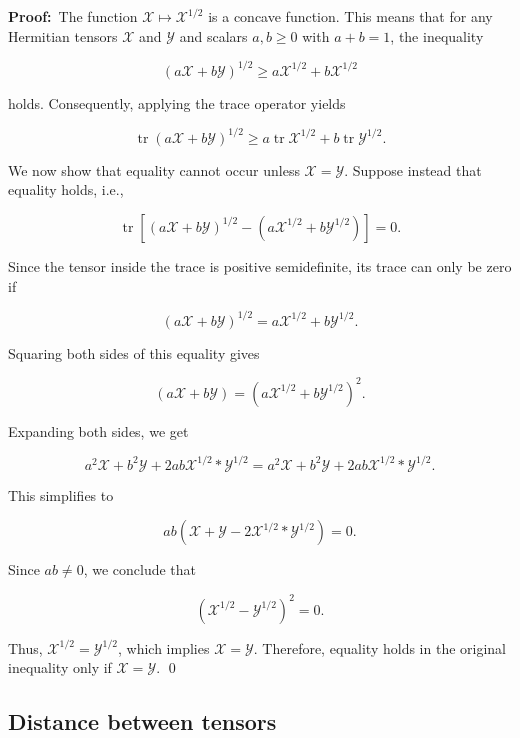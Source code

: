 \documentclass[oupthm]{CUP-JNL-BCM}%
\theoremstyle{oupplain}
\theoremstyle{oupdefinition}
\theoremstyle{oupremark}
\theoremstyle{oupproof}
\numberwithin{equation}{section}
\begin{document}
\noindent\textbf{Proof:}~The function $\mathcal{X} \mapsto \mathcal{X}^{1/2}$ is a concave function.  This means that for any Hermitian tensors $\mathcal{X}$ and $\mathcal{Y}$ and scalars $a, b \geq 0$ with $a + b = 1$, the inequality

\[
(a \mathcal{X} + b \mathcal{Y})^{1/2} \geq a \mathcal{X}^{1/2} + b \mathcal{X}^{1/2}
\]

\noindent holds. Consequently, applying the trace operator yields

\[
\operatorname{tr}(a \mathcal{X} + b \mathcal{Y})^{1/2} \geq a \operatorname{tr} \mathcal{X}^{1/2} + b \operatorname{tr} \mathcal{Y}^{1/2}.
\]

\noindent We now show that equality cannot occur unless $\mathcal{X} = \mathcal{Y}$. Suppose instead that equality holds, i.e.,

\[
\operatorname{tr}\left[(a \mathcal{X} + b \mathcal{Y})^{1/2} - \left(a \mathcal{X}^{1/2} + b \mathcal{Y}^{1/2}\right)\right] = 0.
\]

\noindent Since the tensor inside the trace is positive semidefinite, its trace can only be zero if

\[
(a \mathcal{X} + b \mathcal{Y})^{1/2} = a \mathcal{X}^{1/2} + b \mathcal{Y}^{1/2}.
\]

\noindent Squaring both sides of this equality gives

\[
(a \mathcal{X} + b \mathcal{Y}) = \left( a \mathcal{X}^{1/2} + b \mathcal{Y}^{1/2} \right)^2.
\]

\noindent Expanding both sides, we get

\[
a^2 \mathcal{X} + b^2 \mathcal{Y} + 2a b \mathcal{X}^{1/2}*\mathcal{Y}^{1/2} = a^2 \mathcal{X} + b^2 \mathcal{Y} + 2a b \mathcal{X}^{1/2}* \mathcal{Y}^{1/2}.
\]

\noindent This simplifies to

\[
a b \left( \mathcal{X} + \mathcal{Y} - 2 \mathcal{X}^{1/2}* \mathcal{Y}^{1/2} \right) = 0.
\]

\noindent Since $a b \neq 0$, we conclude that

\[
\left( \mathcal{X}^{1/2} - \mathcal{Y}^{1/2} \right)^2 = 0.
\]

\noindent Thus, $\mathcal{X}^{1/2} = \mathcal{Y}^{1/2}$, which implies $\mathcal{X} = \mathcal{Y}$. Therefore, equality holds in the original inequality only if $\mathcal{X} = \mathcal{Y}$.
 \hfill \qed

   \subsection{Distance between tensors} 
\end{document}
